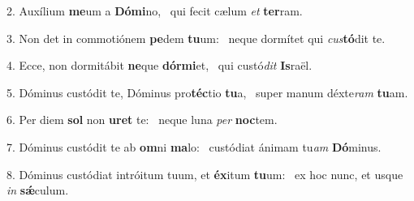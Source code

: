 2. Auxílium \textbf{me}um a \textbf{Dó}\textbf{mi}no, \ast\  qui fecit cælum \textit{et} \textbf{ter}ram.\

3. Non det in commotiónem \textbf{pe}dem \textbf{tu}um: \ast\  neque dormítet qui \textit{cus}\textbf{tó}dit te.\

4. Ecce, non dormitábit \textbf{ne}que \textbf{dór}\textbf{mi}et, \ast\  qui custó\textit{dit} \textbf{Is}raël.\

5. Dóminus custódit te, Dóminus pro\textbf{téc}tio \textbf{tu}a, \ast\  super manum déxte\textit{ram} \textbf{tu}am.\

6. Per diem \textbf{sol} non \textbf{u}\textbf{ret} te: \ast\  neque luna \textit{per} \textbf{noc}tem.\

7. Dóminus custódit te ab \textbf{om}ni \textbf{ma}lo: \ast\  custódiat ánimam tu\textit{am} \textbf{Dó}minus.\

8. Dóminus custódiat intróitum tuum, et \textbf{éx}itum \textbf{tu}um: \ast\  ex hoc nunc, et usque \textit{in} \textbf{sǽ}culum.\

